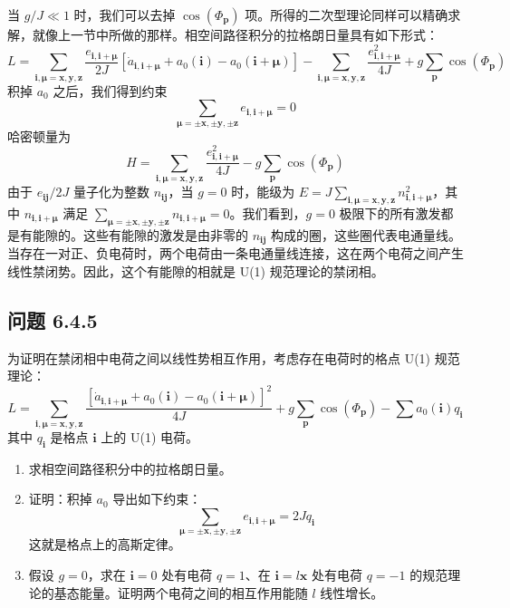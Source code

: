 当 $g/J\ll1$ 时，我们可以去掉 $\cos(\Phi_{\pmb{p}})$ 项。所得的二次型理论同样可以精确求解，就像上一节中所做的那样。相空间路径积分的拉格朗日量具有如下形式：
\begin{equation*}
L=\sum_{\pmb{i},\pmb{\mu}=\pmb{x},\pmb{y},\pmb{z}}\frac{e_{\pmb{i},\pmb{i}+\pmb{\mu}}}{2J}\left[\dot{a}_{\pmb{i},\pmb{i}+\pmb{\mu}}+a_{0}(\pmb{i})-a_{0}(\pmb{i}+\pmb{\mu})\right]-\sum_{\pmb{i},\pmb{\mu}=\pmb{x},\pmb{y},\pmb{z}}\frac{e_{\pmb{i},\pmb{i}+\pmb{\mu}}^{2}}{4J}+g\sum_{\pmb{p}}\cos(\Phi_{\pmb{p}})
\end{equation*}
积掉 $a_{0}$ 之后，我们得到约束
\begin{equation*}
\sum_{\pmb{\mu}=\pm\pmb{x},\pm\pmb{y},\pm\pmb{z}}e_{\pmb{i},\pmb{i}+\pmb{\mu}}=0
\end{equation*}
哈密顿量为
\begin{equation*}
H=\sum_{\pmb{i},\pmb{\mu}=\pmb{x},\pmb{y},\pmb{z}}\frac{e_{\pmb{i},\pmb{i}+\pmb{\mu}}^{2}}{4J}-g\sum_{\pmb{p}}\cos(\Phi_{\pmb{p}})
\end{equation*}
由于 $e_{\pmb{i}\pmb{j}}/2J$ 量子化为整数 $n_{\pmb{i}\pmb{j}}$，当 $g=0$ 时，能级为 $E=J\sum_{\pmb{i},\pmb{\mu}=\pmb{x},\pmb{y},\pmb{z}}n_{\pmb{i},\pmb{i}+\pmb{\mu}}^{2}$，其中 $n_{\pmb{i},\pmb{i}+\pmb{\mu}}$ 满足 $\sum_{\pmb{\mu}=\pm\pmb{x},\pm\pmb{y},\pm\pmb{z}}n_{\pmb{i},\pmb{i}+\pmb{\mu}}=0$。我们看到，$g=0$ 极限下的所有激发都是有能隙的。这些有能隙的激发是由非零的 $n_{\pmb{i}\pmb{j}}$ 构成的圈，这些圈代表电通量线。当存在一对正、负电荷时，两个电荷由一条电通量线连接，这在两个电荷之间产生线性禁闭势。因此，这个有能隙的相就是 U(1) 规范理论的禁闭相。

\subsection*{问题 6.4.5}

为证明在禁闭相中电荷之间以线性势相互作用，考虑存在电荷时的格点 U(1) 规范理论：
\begin{equation*}
L=\sum_{\pmb{i},\pmb{\mu}=\pmb{x},\pmb{y},\pmb{z}}\frac{\left[\dot{a}_{\pmb{i},\pmb{i}+\pmb{\mu}}+a_{0}(\pmb{i})-a_{0}(\pmb{i}+\pmb{\mu})\right]^{2}}{4J}+g\sum_{\pmb{p}}\cos(\Phi_{\pmb{p}})-\sum a_{0}(\pmb{i})q_{\pmb{i}}
\end{equation*}
其中 $q_{\pmb{i}}$ 是格点 $\pmb{i}$ 上的 U(1) 电荷。
\begin{enumerate}
\item[(a)] 求相空间路径积分中的拉格朗日量。
\item[(b)] 证明：积掉 $a_{0}$ 导出如下约束：
\begin{equation*}
\sum_{\pmb{\mu}=\pm\pmb{x},\pm\pmb{y},\pm\pmb{z}}e_{\pmb{i},\pmb{i}+\pmb{\mu}}=2Jq_{\pmb{i}}
\end{equation*}
这就是格点上的高斯定律。
\item[(c)] 假设 $g=0$，求在 $\pmb{i}=0$ 处有电荷 $q=1$、在 $\pmb{i}=l\pmb{x}$ 处有电荷 $q=-1$ 的规范理论的基态能量。证明两个电荷之间的相互作用能随 $l$ 线性增长。
\end{enumerate}
